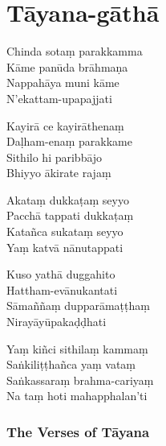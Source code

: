 
\clearpage

\section{Tāyana-gāthā}

\enlargethispage{\baselineskip}

\begin{leader}
\end{leader}

\smallskip


\begin{paritta}
Chinda sotaṃ parakkamma\\
Kāme panūda brāhmaṇa\\
Nappahāya muni kāme\\
N'ekattam-upapajjati

Kayirā ce kayirāthenaṃ\\
Daḷham-enaṃ parakkame\\
Sithilo hi paribbājo\\
Bhiyyo ākirate rajaṃ

Akataṃ dukkaṭaṃ seyyo\\
Pacchā tappati dukkaṭaṃ\\
Katañca sukataṃ seyyo\\
Yaṃ katvā nānutappati

Kuso yathā duggahito\\
Hattham-evānukantati\\
Sāmaññaṃ dupparāmaṭṭhaṃ\\
Nirayāyūpakaḍḍhati

Yaṃ kiñci sithilaṃ kammaṃ\\
Saṅkiliṭṭhañca yaṃ vataṃ\\
Saṅkassaraṃ brahma-cariyaṃ\\
Na taṃ hoti mahapphalan'ti 
\end{paritta}

\clearpage

\subsubsection{The Verses of Tāyana}

\bigskip

